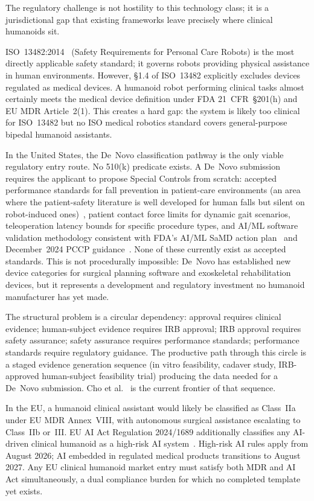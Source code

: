 The regulatory challenge is not hostility to this technology class; it is a
jurisdictional gap that existing frameworks leave precisely where clinical
humanoids sit.

ISO~13482:2014~\cite{iso13482} (Safety Requirements for Personal Care Robots) is
the most directly applicable safety standard; it governs robots providing
physical assistance in human environments. However, \S{}1.4 of ISO~13482
explicitly excludes devices regulated as medical devices. A humanoid robot performing
clinical tasks almost certainly meets the medical device definition under FDA
21~CFR~\S{}201(h) and EU MDR Article~2(1). This creates a hard gap: the system
is likely too clinical for ISO~13482 but no ISO medical robotics standard covers
general-purpose bipedal humanoid assistants.

In the United States, the De~Novo classification pathway is the only viable
regulatory entry route. No 510(k) predicate exists. A De~Novo submission requires
the applicant to propose Special Controls from scratch: accepted performance
standards for fall prevention in patient-care environments (an area where the
patient-safety literature is well developed for human falls but silent on
robot-induced ones)~\cite{oliver2007strategies,cameron2012interventions}, patient
contact force limits for dynamic gait scenarios, teleoperation latency bounds for specific
procedure types, and AI/ML software validation methodology consistent with FDA's
AI/ML SaMD action plan~\cite{fda2021aiml} and December~2024 PCCP
guidance~\cite{fda2024pccp}. None of these currently exist as accepted standards. This is not procedurally
impossible: De~Novo has established new device categories for surgical planning
software and exoskeletal rehabilitation devices, but it represents a development
and regulatory investment no humanoid manufacturer has yet made.

The structural problem is a circular dependency: approval requires clinical
evidence; human-subject evidence requires IRB approval; IRB approval requires
safety assurance; safety assurance requires performance standards; performance
standards require regulatory guidance. The productive path through this circle is
a staged evidence generation sequence (in vitro feasibility, cadaver study,
IRB-approved human-subject feasibility trial) producing the data needed for a
De~Novo submission. Cho et al.~\cite{cho2026humanoid} is the current frontier of
that sequence.

In the EU, a humanoid clinical assistant would likely be classified as Class~IIa
under EU MDR Annex~VIII, with autonomous surgical assistance escalating to
Class~IIb or~III. EU AI Act Regulation 2024/1689 additionally classifies any
AI-driven clinical humanoid as a high-risk AI system~\cite{solaiman2024regulating}. High-risk AI rules apply
from August 2026; AI embedded in regulated medical products transitions to August
2027. Any EU clinical humanoid market entry must satisfy both MDR and AI Act
simultaneously, a dual compliance burden for which no completed template yet
exists.


